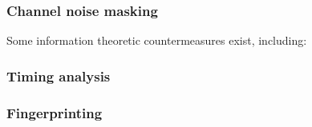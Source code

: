 \subsubsection{Channel noise masking}

Some information theoretic countermeasures exist, including:


\subsubsection{Timing analysis}

\subsubsection{Fingerprinting}
